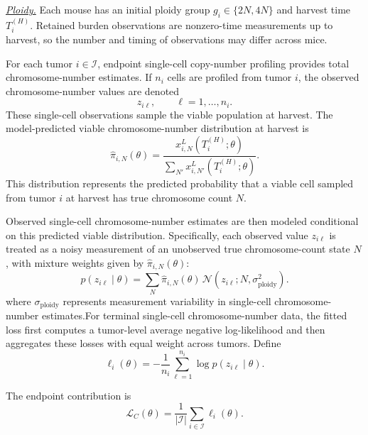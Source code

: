 \documentclass[11pt]{article}
\begin{document}
\underline{\textit{Ploidy.}} Each mouse has an initial ploidy group $g_i\in\{2N,4N\}$ and harvest time $T_i^{(H)}$. Retained burden observations are nonzero-time measurements up to harvest, so the number and timing of observations may differ across mice.

For each tumor $i\in\mathcal I$, endpoint single-cell copy-number profiling provides total chromosome-number estimates. If $n_i$ cells are profiled from tumor $i$, the observed chromosome-number values are denoted
\begin{equation}
z_{i\ell},\qquad \ell=1,\dots,n_i.
\label{eq:appendix_observed_chromosome_values}
\end{equation}
These single-cell observations sample the viable population at harvest. The model-predicted viable chromosome-number distribution at harvest is
\begin{equation}
\widehat{\pi}_{i,N}(\theta)
=
\frac{
x^{L}_{i,N}(T_i^{(H)};\theta)
}{
\sum_{N'}
x^{L}_{i,N'}(T_i^{(H)};\theta)
}.
\label{eq:appendix_ploidy_distribution}
\end{equation}
This distribution represents the predicted probability that a viable cell sampled from tumor $i$ at harvest has true chromosome count $N$.

Observed single-cell chromosome-number estimates are then modeled conditional on this predicted viable distribution. Specifically, each observed value $z_{i\ell}$ is treated as a noisy measurement of an unobserved true chromosome-count state $N$, with mixture weights given by $\widehat{\pi}_{i,N}(\theta)$:
\begin{equation}
p(z_{i\ell}\mid \theta)
=
\sum_N
\widehat{\pi}_{i,N}(\theta)
\, 
\mathcal N
\!\left(
z_{i\ell};
N,
\sigma_{\mathrm{ploidy}}^2
\right).
\label{eq:appendix_ploidy_likelihood}
\end{equation}
where $\sigma_{\mathrm{ploidy}}$ represents measurement variability in single-cell chromosome-number estimates.For terminal single-cell chromosome-number data, the fitted loss first computes a tumor-level average negative log-likelihood and then aggregates these losses with equal weight across tumors. Define
\begin{equation}
\ell_i(\theta)
=
-\frac{1}{n_i}
\sum_{\ell=1}^{n_i}
\log
p(z_{i\ell}\mid \theta).
\label{eq:appendix_ploidy_loss_tumor}
\end{equation} 

The endpoint contribution is
\begin{equation}
\mathcal L_C(\theta)
=\frac{1}{|\mathcal I|}
\sum_{i\in\mathcal I}
\ell_i(\theta).\label{eq:appendix_ploidy_loss}
\end{equation}
\end{document}
